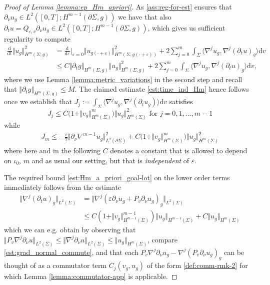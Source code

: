\documentclass[10pt,reqno]{amsart}
\theoremstyle{plain}
\theoremstyle{definition}
\newcommand{\pnu}{\partial_\nu}
\numberwithin{equation}{section}
\newcommand{\Si}{\Sigma}
\newcommand{\ep}{\varepsilon}
\newcommand{\norm}[1]{\Vert#1\Vert}
\newcommand{\beqa}{\begin{equation}\begin{aligned}}
\newcommand{\eeqa}{\end{aligned}\end{equation}}
\newcommand{\dd}{\mathrm{d}} %
\newcommand{\pt}{\partial_t}
\newcommand{\eps}{\varepsilon}
\newcommand{\na}{\nabla}
\newcommand{\pSi}{{\partial \Sigma}}
\newcommand{\p}{\partial} %
\newcommand{\inner}[2]{\langle #1, #2\rangle} %
\begin{document}
\begin{proof}[Proof of Lemma \ref{lemma:ep_Hm_apriori}]	
    As \eqref{ass:reg-for-est} ensures that $\p_\nu u_g \in L^2([0,T];H^{m-1}(\pSi,g))$ 
    we have that also $\p_t u=Q_{\eps,v}\p_\nu u_g \in L^2([0,T];H^{m-1}(\pSi,g))$, which gives us sufficient regularity to compute 
    \begin{align*}
		\frac{\dd}{\dd t}\norm{u_g}_{H^m(\Si,g)}^2 &= \frac{\dd}{\dd \ep}\Big|_{\ep=0} \norm{u_{g(\cdot+\eps)}}_{H^{m}(\Si,g(\cdot+\eps))}^2 +2 \sum_{j=0}^m\int_{\Si}\inner{\nabla^j u_g}{\nabla^j(\p_t u)_g}\dd v \\
		&\leq C \norm{\pt g}_{H^m(\Si,g)} \norm{u_g}_{H^m(\Si,g)}^2+2 \sum_{j=0}^m\int_{\Si}\inner{\nabla^j u_g}{\nabla^j(\p_t u)_g}\dd v,
	\end{align*}
    where we use Lemma \ref{lemma:metric_variations} in the second step and recall that $ \norm{\pt g}_{H^m(\Si,g)} \leq M$. The claimed estimate \eqref{est:time_ind_Hm} hence follows once we establish that $J_j:=\int_{\Si}\inner{\nabla^j u_g}{\nabla^j(\p_t u_g)}\dd v $ satisfies
	\begin{equation}\label{est:Hm_a_priori_goal-lot}
		J_j \leq C\big(1 + \norm{v_g}_{H^{m}(\Si)}^m\big)\norm{u_g}_{H^m(\Si)}^2 \text{ for }j=0,1,\dots,m-1
	\end{equation}
    while
    \begin{align}\label{est:Hm_a_priori_goal}
		J_m \leq - \tfrac{\eps}{2} \norm{\p_\nu \nabla^{m-1} u_g}_{L^2(\p\Si)}^2 + C\big(1 + \norm{v_g}_{H^{m}(\Si)}^m\big)\norm{u_g}_{H^m(\Si)}^2 
	\end{align}
    where here and in the following $C$ denotes a constant that is allowed to depend on $\iota_0$, $m$ and as usual our setting, but that is \textit{independent} of $\eps$.  

    The required bound \eqref{est:Hm_a_priori_goal-lot} on the lower order terms immediately follows from the estimate 
    \beqa\label{est:Hj-velocity}
        \norm{\na^j (\pt u)_g}_{L^2(\Si)} &= \norm{\na^j (\eps \pnu u_g+ P_{v}\pnu u_g)_g}_{L^2(\Si)}\\
        &\leq C (1 + \norm{v_g}_{H^{m-1}(\Si)}^{m-1})\norm{u_g}_{H^{m-1}(\Si)}+C\norm{u_g}_{H^m(\Si)}
    \eeqa
    which we can e.g. obtain by observing that $\norm{P_v \na^j\pnu u}_{L^2(\Si)} \leq \norm{\na^j\pnu u}_{L^2(\Si)}\leq \norm{u_g}_{H^m(\Si)}$, compare \eqref{est:grad_normal_commute}, and that each $P_v \na^j\pnu u_g-\na^j (P_{v}\pnu u_g)_g$ can be thought of as a commutator term $C_{j}(v_g,u_g)$ of the form \eqref{def:comm-rmk-2} for which Lemma \ref{lemma:commutator-app} is applicable.


\end{proof}
\end{document}
